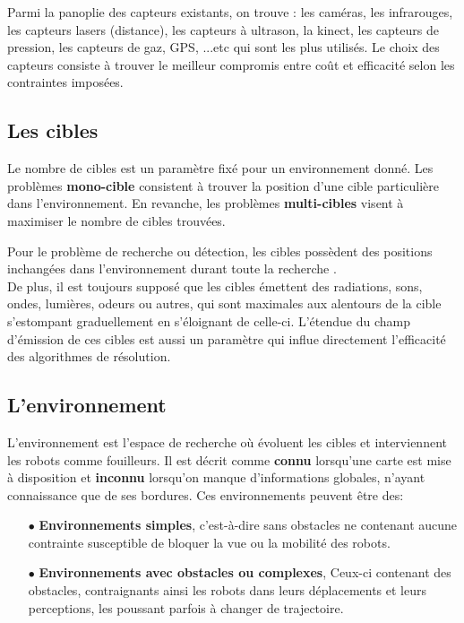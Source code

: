 Parmi la panoplie des capteurs existants, on trouve : les caméras, les infrarouges, les capteurs lasers (distance), les capteurs à ultrason, la kinect, les capteurs de pression, les capteurs de gaz, GPS, ...etc \cite{capteur} qui sont les plus utilisés. Le choix des capteurs consiste à trouver le meilleur compromis entre coût et efficacité selon les contraintes imposées. 

\subsection{Les cibles}
Le nombre de cibles est un paramètre fixé pour un environnement donné. Les problèmes \textbf{mono-cible} consistent à trouver la position d'une cible particulière dans l'environnement. En revanche, les problèmes \textbf{multi-cibles} visent à maximiser le nombre de cibles trouvées. 

Pour le problème de recherche ou détection, les cibles possèdent des positions inchangées dans l'environnement durant toute la recherche 
\cite{surv1}.\\

De plus, il est toujours supposé que les cibles émettent des radiations, sons, ondes, lumières, odeurs ou autres, qui sont maximales aux alentours de la cible  s'estompant graduellement en s'éloignant de celle-ci. L'étendue du champ d'émission de ces cibles est aussi un paramètre qui influe directement l'efficacité des algorithmes de résolution.

\subsection{L'environnement \cite{surv2}}
L'environnement est l'espace de recherche où évoluent les cibles et interviennent les robots comme fouilleurs. Il est décrit comme \textbf{connu} lorsqu’une carte est mise à disposition et \textbf{inconnu} lorsqu'on manque d'informations globales, n'ayant connaissance que de ses bordures. Ces environnements peuvent être des:

\begin{itemize} 
	\item[$\bullet$] \textbf{Environnements simples}, c'est-à-dire sans obstacles ne contenant aucune contrainte susceptible de bloquer la vue ou la mobilité des robots.
	
	\item[$\bullet$] \textbf{Environnements avec obstacles ou complexes}, Ceux-ci contenant des obstacles, contraignants ainsi les robots dans leurs déplacements et leurs perceptions, les poussant parfois à changer de trajectoire.
\end{itemize}

